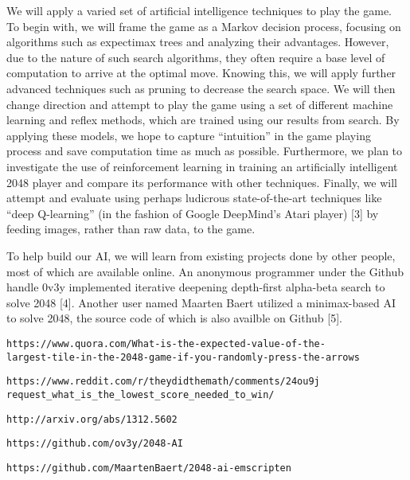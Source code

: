 \documentclass[11pt]{article}
\begin{document}
We will apply a varied set of artificial intelligence techniques to play the game. To begin with, we will frame the game as a Markov decision process, focusing on algorithms such as expectimax trees and analyzing their advantages. However, due to the nature of such search algorithms, they often require a base level of computation to arrive at the optimal move. Knowing this, we will apply further advanced techniques such as pruning to decrease the search space. We will then change direction and attempt to play the game using a set of different machine learning and reflex methods, which are trained using our results from search. By applying these models, we hope to capture “intuition” in the game playing process and save computation time as much as possible. Furthermore, we plan to investigate the use of reinforcement learning in training an artificially intelligent 2048 player and compare its performance with other techniques. Finally, we will attempt and evaluate using perhaps ludicrous state-of-the-art techniques like “deep Q-learning” (in the fashion of Google DeepMind’s Atari player) [3] by feeding images, rather than raw data, to the game. 

To help build our AI, we will learn from existing projects done by other people, most of which are available online. An anonymous programmer under the Github handle 0v3y implemented iterative deepening depth-first alpha-beta search to solve 2048 [4]. Another user named Maarten Baert utilized a minimax-based AI to solve 2048, the source code of which is also availble on Github [5].

\begin{thebibliography}{9}

 \texttt{https://www.quora.com/What-is-the-expected-value-of-the-\\largest-tile-in-the-2048-game-if-you-randomly-press-the-arrows}

 \begin{verbatim}https://www.reddit.com/r/theydidthemath/comments/24ou9j
request_what_is_the_lowest_score_needed_to_win/\end{verbatim}

 \texttt{http://arxiv.org/abs/1312.5602}

 \texttt{https://github.com/ov3y/2048-AI}

 \texttt{https://github.com/MaartenBaert/2048-ai-emscripten}

\end{thebibliography}
\end{document}
